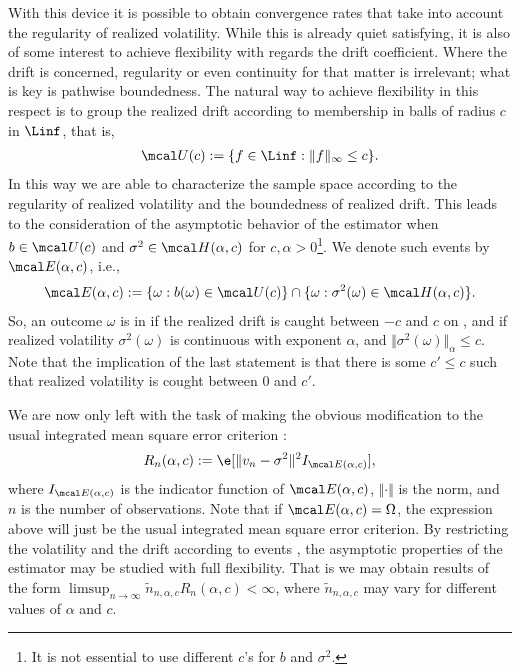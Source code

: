 With this device it is possible to obtain convergence rates that take into account the regularity of realized volatility. While this is already quiet satisfying,  it is also of some interest to achieve  flexibility with regards the drift coefficient. Where the drift is concerned, regularity or even continuity for that matter is irrelevant; what is key is pathwise boundedness. The natural way to achieve flexibility in this respect is to group the  realized drift according to membership in  balls of radius $c$ in $\Linf$, that is,   
\begin{align} 
  \uball{c} := \{f \in \Linf: \Vert f \Vert_\infty \le c \}.
\end{align}
In this way we are able to  characterize the sample space according to the regularity of realized volatility  and the boundedness of realized drift.  This leads to the consideration of the asymptotic behavior of the estimator when  $b \in \uball{c}$ and $\sigma^2 \in  \hball{\alpha}{c}$ for  $c, \alpha > 0$\footnote{It is not essential to use different $c$'s for $b$ and $\sigma^2$.}. We denote such events by $\eball{\alpha}{c}$, i.e., 
\begin{align}
  \eball{\alpha}{c}  := \{ \omega : b(\omega) \in \uball{c}\} \cap \{\omega: \sigma^2(\omega) \in \hball{\alpha}{c}\}.\notag
  \label{}
\end{align}
So, an outcome $\omega$  is in  if the  realized drift is caught between $-c$ and $c$ on \domain, and if  realized volatility $\sigma^2(\omega)$  is \holder continuous with exponent $\alpha$,  and $\Vert \sigma^2(\omega) \Vert_\alpha \le c$. Note that the implication of the last statement is that there is some $c' \le c$ such that realized volatility is cought between $0$ and $c'$.     

We are now only left with the task of making the  obvious  modification to the usual  integrated mean square error criterion :
\begin{align}
  R_n(\alpha, c) := \e[\Vert v_n - \sigma^2\Vert^2\indvol],\notag
  \label{}
\end{align} 
where  $\indvol$ is the indicator function of $\eball{\alpha}{c}$, $\Vert \cdot \Vert$ is the \Ltwo norm, and $n$ is the number of observations. Note that if $\eball{\alpha}{c} = \Omega$,  the expression above will just be the usual integrated mean square error criterion. By restricting the  volatility and the drift according to  events , the asymptotic properties of the estimator may be studied with full flexibility. That is we may  obtain results of the form  $\limsup_{n \to \infty}\tilde{n}_{n,\alpha,c} R_n(\alpha,c) < \infty$, where $\tilde{n}_{n,\alpha,c}$ may vary for different values of $\alpha$ and $c$. 

